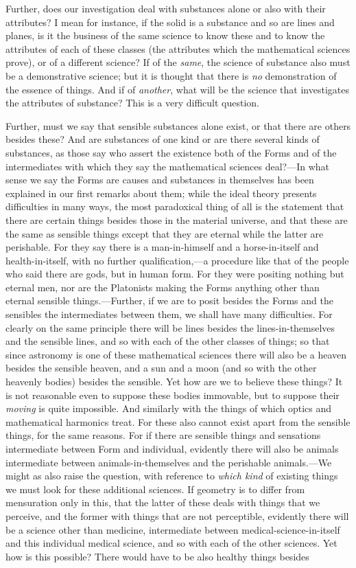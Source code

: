 Further, does our investigation deal with substances alone or also with their attributes? I mean for instance, if the solid is a substance and so are lines and planes, is it the business of the same science to know these and to know the attributes of each of these classes (the attributes which the mathematical sciences prove), or of a different science? If of the \emph{same}, the science of substance also must be a demonstrative science; but it is thought that there is \emph{no} demonstration of the essence of things. And if of \emph{another}, what will be the science that investigates the attributes of substance? This is a very difficult question.

Further, must we say that sensible substances alone exist, or that there are others besides these? And are substances of one kind or are there several kinds of substances, as those say who assert the existence both of the Forms and of the intermediates with which they say the mathematical sciences deal?—In what sense we say the Forms are causes and substances in themselves has been explained in our first remarks about them; while the ideal theory presents difficulties in many ways, the most paradoxical thing of all is the statement that there are certain things besides those in the material universe, and that these are the same as sensible things except that they are eternal while the latter are perishable. For they say there is a man-in-himself and a horse-in-itself and health-in-itself, with no further qualification,—a procedure like that of the people who said there are gods, but in human form. For they were positing nothing but eternal men, nor are the Platonists making the Forms anything other than eternal sensible things.—Further, if we are to posit besides the Forms and the sensibles the intermediates between them, we shall have many difficulties. For clearly on the same principle there will be lines besides the lines-in-themselves and the sensible lines, and so with each of the other classes of things; so that since astronomy is one of these mathematical sciences there will also be a heaven besides the sensible heaven, and a sun and a moon (and so with the other heavenly bodies) besides the sensible. Yet how are we to believe these things? It is not reasonable even to suppose these bodies immovable, but to suppose their \emph{moving} is quite impossible. And similarly with the things of which optics and mathematical harmonics treat. For these also cannot exist apart from the sensible things, for the same reasons. For if there are sensible things and sensations intermediate between Form and individual, evidently there will also be animals intermediate between animals-in-themselves and the perishable animals.—We might as also raise the question, with reference to \emph{which kind} of existing things we must look for these additional sciences. If geometry is to differ from mensuration only in this, that the latter of these deals with things that we perceive, and the former with things that are not perceptible, evidently there will be a science other than medicine, intermediate between medical-science-in-itself and this individual medical science, and so with each of the other sciences. Yet how is this possible? There would have to be also healthy things besides 